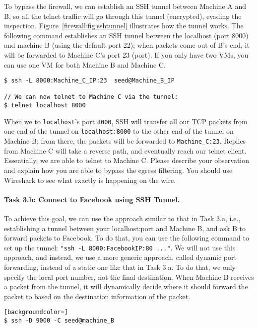 To bypass the firewall, we can establish an SSH tunnel between
Machine A and B, so all the telnet traffic will go through this tunnel
(encrypted), evading the inspection. Figure~\ref{firewall:fig:sshtunnel}
illustrates how the tunnel works. 
The following command 
establishes an SSH tunnel between the localhost (port 8000) and 
machine B (using the default port 22); when packets come out of B's end, it will
be forwarded to Machine C's port 23 (\telnet port). If you only have two VMs,
you can use one VM for both Machine B and Machine C.


\begin{lstlisting}
$ ssh -L 8000:Machine_C_IP:23  seed@Machine_B_IP

// We can now telnet to Machine C via the tunnel:
$ telnet localhost 8000
\end{lstlisting}

When we \telnet to \texttt{localhost}'s port \texttt{8000},  
SSH will transfer all our TCP packets from
one end of the tunnel on \texttt{localhost:8000} to the other end of the tunnel
on Machine B; from there,
the packets will be forwarded to \texttt{Machine\_C:23}. Replies from Machine C will
take a reverse path, and eventually reach our telnet client.
Essentially, we are able to telnet to Machine C.
Please describe your observation and explain how you are able to 
bypass the egress filtering. You should use Wireshark to see
what exactly is happening on the wire.



\paragraph{Task 3.b: Connect to Facebook using SSH Tunnel.}
To achieve this goal, we can use the approach similar to that in 
Task 3.a, i.e., establishing a tunnel between your localhost:port
and Machine B, and ask B to forward packets to Facebook. To do 
that, you can use the following command to set up the tunnel:
{\tt "ssh -L 8000:FacebookIP:80 ..."}. 
We will not use this approach, and instead, we 
use a more generic approach, called dynamic port forwarding, instead of a static one
like that in Task 3.a. To do that, we only specify the local
port number, not the final destination. When Machine B receives
a packet from the tunnel, it will dynamically decide where it should 
forward the packet to based on the destination information of
the packet.


\begin{lstlisting}[backgroundcolor=]
$ ssh -D 9000 -C seed@machine_B
\end{lstlisting}


